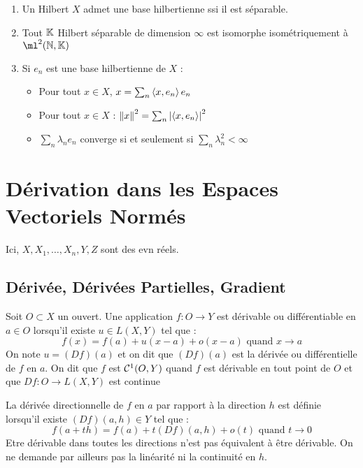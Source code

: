 \documentclass{cours}
\begin{document}
\begin{theorem}
    \begin{enumerate}
        \item Un Hilbert $X$ admet une base hilbertienne ssi il est séparable.
        \item Tout $\mathbb{K}$ Hilbert séparable de dimension $\infty$ est isomorphe isométriquement à $\ml^{2}(\N,\K)$
        \item Si $e_{n}$ est une base hilbertienne de $X$ : 
        \begin{itemize}
            \item Pour tout $x \in X$, $x = \sum_{n} \left\langle x, e_{n} \right\rangle e_{n}$
            \item Pour tout $x \in X$ : $\left\lVert x \right\rVert^{2} = \sum_{n}\left|\left\langle x, e_{n} \right\rangle\right|^{2}$
            \item $\sum_{n} \lambda_{n}e_{n}$ converge si et seulement si $\sum_{n} \lambda_{n}^{2} < \infty$ 
        \end{itemize}
    \end{enumerate}    
\end{theorem}

\section{Dérivation dans les Espaces Vectoriels Normés}
Ici, $X, X_{1}, \ldots, X_{n}, Y, Z$ sont des evn réels.

\subsection{Dérivée, Dérivées Partielles, Gradient}
\begin{definition}
    Soit $O \subset X$ un ouvert. Une application $f : O \rightarrow Y$ est dérivable ou différentiable en $a \in O$ lorsqu'il existe $u \in L(X, Y)$ tel que : 
    \[
        f(x) = f(a) + u(x - a) + o(x - a) \text{ quand } x \rightarrow a
    \]
    On note $u = (Df)(a)$ et on dit que $(Df)(a)$ est la dérivée ou différentielle de $f$ en $a$. On dit que $f$ est $\mathcal{C}^{1}(O, Y)$ quand $f$ est dérivable en tout point de $O$ et que $Df : O \rightarrow L(X, Y)$ est continue
\end{definition}

\begin{definition}
    La dérivée directionnelle de $f$ en $a$ par rapport à la direction $h$ est définie lorsqu'il existe $(Df)(a, h) \in Y$ tel que : 
    \[
        f(a + th) = f(a) + t(Df)(a, h) + o(t) \text{ quand } t\rightarrow 0
    \]
    Etre dérivable dans toutes les directions n'est pas équivalent à être dérivable. On ne demande par ailleurs pas la linéarité ni la continuité en $h$.
\end{definition}
\end{document}
